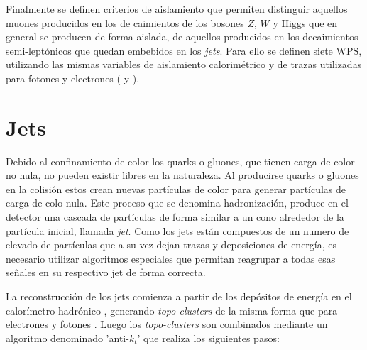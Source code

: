 Finalmente se definen criterios de aislamiento que permiten distinguir aquellos muones producidos en los de caimientos de los bosones $Z$, $W$ y Higgs que en general se producen de forma aislada, de aquellos producidos en los decaimientos semi-leptónicos que quedan embebidos en los \textit{jets}. Para ello se definen siete WPS, utilizando las mismas variables de aislamiento calorimétrico y de trazas utilizadas para fotones y electrones ( y ).


\section{Jets}

Debido al confinamiento de color los quarks o gluones, que tienen carga de color no nula, no pueden existir libres en la naturaleza. Al producirse quarks o gluones en la colisión estos crean nuevas partículas de color para generar partículas de carga de colo nula. Este proceso que se denomina hadronización, produce en el detector una cascada de partículas de forma similar a un cono alrededor de la partícula inicial, llamada \textit{jet}. Como los jets están compuestos de un numero de elevado de partículas que a su vez dejan trazas y deposiciones de energía, es necesario utilizar algoritmos especiales que permitan reagrupar a todas esas señales en su respectivo jet de forma correcta.

La reconstrucción de los jets comienza a partir de los depósitos de energía en el calorímetro hadrónico , generando \textit{topo-clusters} de la misma forma que para electrones y fotones \cite{Lampl:1099735}. Luego los \textit{topo-clusters} son combinados mediante un algoritmo denominado 'anti-$k_t$' \cite{Cacciari:2008gp} que realiza los siguientes pasos:

